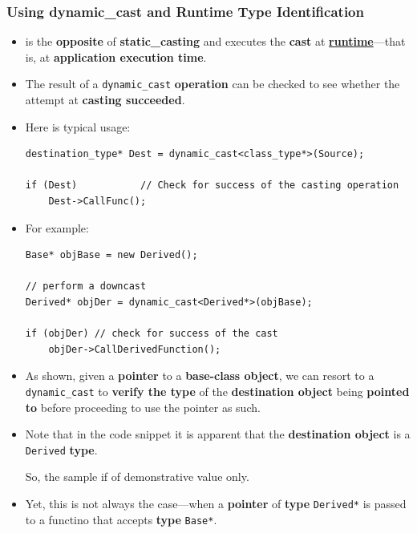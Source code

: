 \documentclass[10pt]{article}
\newcommand{\vocab}[1]{\fbox{\textbf{\textit{#1}}}}
\begin{document}
\newpage

\subsubsection{Using dynamic\_cast and Runtime Type Identification}
\begin{itemize}
	\item \vocab{Dynamic\_casting} is the \textbf{opposite} of \textbf{static\_casting} and executes the \textbf{cast} at \underline{\textbf{runtime}}---that is, at \textbf{application execution time}.

	\item The result of a \verb|dynamic_cast| \textbf{operation} can be checked to see whether the attempt at \textbf{casting succeeded}.

	\item Here is typical usage:
		\begin{verbatim}
destination_type* Dest = dynamic_cast<class_type*>(Source);

if (Dest)			// Check for success of the casting operation
	Dest->CallFunc();
		\end{verbatim}

	\item For example:

		\begin{verbatim}
Base* objBase = new Derived();

// perform a downcast
Derived* objDer = dynamic_cast<Derived*>(objBase);

if (objDer)	// check for success of the cast	
	objDer->CallDerivedFunction();
		\end{verbatim}

	\item As shown, given a \textbf{pointer} to a \textbf{base-class object}, we can resort to a \verb|dynamic_cast| to \textbf{verify the type} of the \textbf{destination object} being \textbf{pointed to} before proceeding to use the pointer as such.

\item Note that in the code snippet it is apparent that the \textbf{destination object} is a \verb|Derived| \textbf{type}.

	So, the sample if of demonstrative value only.

\item Yet, this is not always the case---when a \textbf{pointer} of \textbf{type} \verb|Derived*| is passed to a functino that accepts \textbf{type} \verb|Base*|.


\end{itemize}
\end{document}
